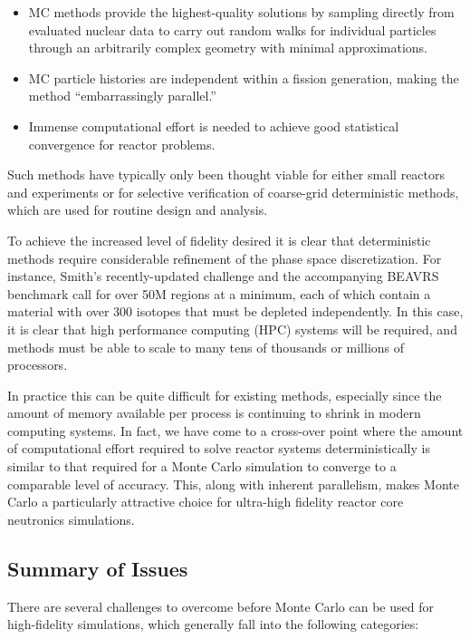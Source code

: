 \documentclass[12pt,twoside]{mitthesis-exec}
\begin{document}
\begin{itemize}
  \item MC methods provide the highest-quality solutions by sampling directly from
  evaluated nuclear data to carry out random walks for individual particles
  through an arbitrarily complex geometry with minimal approximations.
  \item MC particle histories are independent within a fission generation, making
  the method ``embarrassingly parallel.''
  \item Immense computational effort is needed to achieve good statistical
  convergence for reactor problems.
\end{itemize}

Such methods have typically only been thought viable for either small reactors
and experiments or for selective verification of coarse-grid deterministic
methods, which are used for routine design and analysis.

To achieve the increased level of fidelity desired it is clear that
deterministic methods require considerable refinement of the phase space discretization.
For instance, Smith's recently-updated challenge
\cite{Smith_Forget_2013} and the accompanying BEAVRS benchmark \cite{mcbeavrs}
call for over 50M regions at a minimum, each of which contain a material with
over 300 isotopes that must be depleted independently. In this case, it is clear
that high performance computing (HPC) systems will be required, and methods must
be able to scale to many tens of thousands or millions of processors.

In practice this can be quite difficult for existing methods, especially since
the amount of memory available per process is continuing to shrink in modern
computing systems. In fact, we have come to a cross-over point where the
amount of computational effort required to solve reactor systems
deterministically is similar to that required for a Monte Carlo simulation to
converge to a comparable level of accuracy. This, along with inherent
parallelism, makes Monte Carlo a particularly attractive choice
for ultra-high fidelity reactor core neutronics simulations.

\newpage
\subsection*{Summary of Issues}

There are several challenges to overcome before Monte Carlo can be used for
high-fidelity simulations, which generally fall into the following categories:
\end{document}
